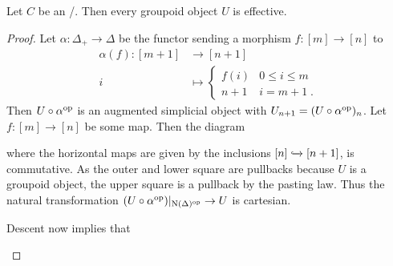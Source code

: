 \begin{prop} %
    Let $C$ be an \inftytop/.
    Then every groupoid object $U$ is effective.
    \begin{proof}
        Let $\alpha\colon\Delta_+\to\Delta$ be the functor sending a morphism $f\colon [m]\to[n]$ to 
        \begin{align*}
            \alpha(f)\colon [m+1]&\to[n+1]\\
            i&\mapsto
            \begin{cases}
                f(i) & 0\leq i\leq m\\
                n+1 & i=m+1\;.
            \end{cases}
        \end{align*}
        Then $U\circ\alpha^{\operatorname{op}}$ is an augmented simplicial object with $U_{n+1}=(U\circ\alpha^{\operatorname{op}})_n$.
        Let $f\colon [m]\to[n]$ be some map. Then the diagram
        \begin{center}
        \end{center}
        where the horizontal maps are given by the inclusions $[n]\xhookrightarrow{}[n+1]$, is commutative. 
        As the outer and lower square are pullbacks because $U$ is a groupoid object, the upper square is a pullback by the pasting law.
        Thus the natural transformation $(U\circ\alpha^{\operatorname{op}})|_{\operatorname{N}(\Delta)^{\operatorname{op}}}\to U$ is cartesian.

        Descent now implies that 
        \begin{center}
\end{center}
\end{proof}
\end{prop}
